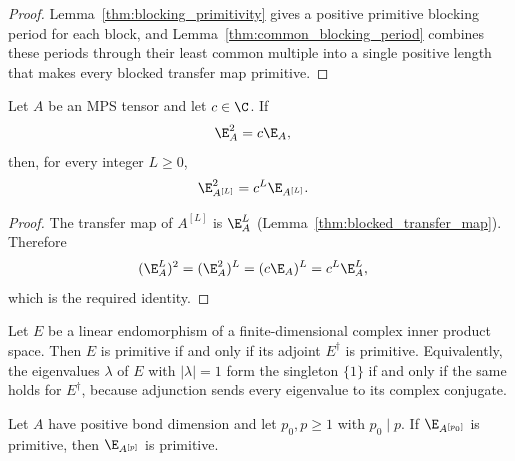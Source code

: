 \begin{proof}\leanok
    Lemma~\ref{thm:blocking_primitivity} gives a positive primitive blocking
    period for each block, and Lemma~\ref{thm:common_blocking_period} combines
    these periods through their least common multiple into a single positive
    length that makes every blocked transfer map primitive.
\end{proof}

\begin{lemma}%
    \label{thm:transfer_map_block_tensor_quasi_idempotent}
    \leanok
    Let $A$ be an MPS tensor and let $c\in\C$. If
    \begin{align}
        \E_A^2 & =c\E_A,
        \notag
    \end{align}
    then, for every integer $L\geq0$,
    \begin{align}
        \E_{A^{[L]}}^2 & =c^L\E_{A^{[L]}}.
        \notag
    \end{align}
\end{lemma}

\begin{proof}\leanok
    The transfer map of $A^{[L]}$ is $\E_A^L$
    (Lemma~\ref{thm:blocked_transfer_map}). Therefore
    \begin{align}
        (\E_A^L)^2
         & =(\E_A^2)^L
        =(c\E_A)^L
        =c^L\E_A^L,
        \notag
    \end{align}
    which is the required identity.
\end{proof}

\begin{lemma}%
    \label{thm:primitive_adjoint_equiv}
    \leanok
    Let $E$ be a linear endomorphism of a finite-dimensional complex inner
    product space. Then $E$ is primitive if and only if its adjoint
    $E^\dagger$ is primitive. Equivalently, the eigenvalues $\lambda$ of $E$
    with $|\lambda|=1$ form the singleton $\{1\}$ if and only if the same
    holds for $E^\dagger$, because adjunction sends every eigenvalue to its
    complex conjugate.
\end{lemma}

\begin{lemma}%
    \label{thm:primitive_blocking_divisible}
    \leanok
    Let $A$ have positive bond dimension and let $p_0,p\ge1$ with $p_0\mid p$.
    If $\E_{A^{[p_0]}}$ is primitive, then $\E_{A^{[p]}}$ is primitive.
\end{lemma}

